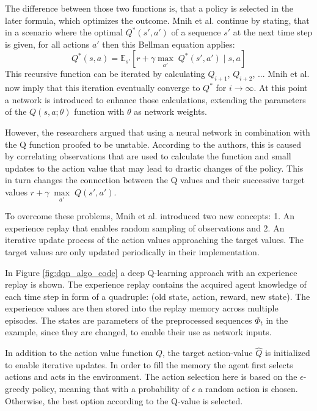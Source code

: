 The difference between those two functions is, that a policy is selected in the later formula, which optimizes the outcome. Mnih et al. continue by stating, that in a scenario where the optimal $Q^*(s',a')$ of a sequence $s'$ at the next time step is given, for all actions $a'$ then this Bellman equation applies: 
\begin{equation}\label{eq:bel_qvalue}
    Q^*(s,a) =  \mathbb{E}_{s'} \left[ r+ \gamma \underset{a'}\max \; Q^* (s', a') \mid s,a \right]
\end{equation}
This recursive function can be iterated by calculating $Q_{i+1}$, $Q_{i+2}$, ... Mnih et al. now imply that this iteration eventually converge to $Q^*$ for $i \rightarrow \infty$. At this point a network is introduced to enhance those calculations, extending the parameters of the $Q(s,a;\theta)$ function with $\theta$ as network weights.

However, the researchers argued that using a neural network in combination with the Q function proofed to be unstable. According to the authors, this is caused by correlating observations that are used to calculate the function and small updates to the action value that may lead to drastic changes of the policy. This in turn changes the connection between the Q values and their successive target values $r+\gamma \; \underset{a'} \max \; Q(s',a')$.

To overcome these problems, Mnih et al. introduced two new concepts: 1. An experience replay that enables random sampling of observations and 2. An iterative update process of the action values approaching the target values. The target values are only updated periodically in their implementation.

In Figure \ref{fig:dqn_algo_code} a deep Q-learning approach with an experience replay is shown. The experience replay contains the acquired agent knowledge of each time step in form of a quadruple: (old state, action, reward, new state). The experience values are then stored into the replay memory across multiple episodes. The states are parameters of the preprocessed sequences $\Phi_{t}$ in the example, since they are changed, to enable their use as network inputs.

In addition to the action value function $Q$, the target action-value $\hat Q$ is initialized to enable iterative updates. In order to fill the memory the agent first selects actions and acts in the environment. The action selection here is based on the $\epsilon$-greedy policy, meaning that with a probability of $\epsilon$ a random action is chosen. Otherwise, the best option according to the Q-value is selected.

